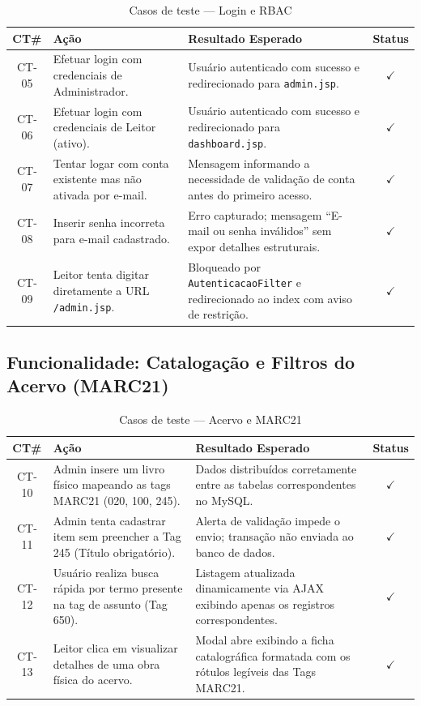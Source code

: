 \begin{table}[h!]
	\centering
	\caption{Casos de teste --- Login e RBAC}
	\label{tab:teste_login}
	\begin{tabular}{|c|p{6cm}|p{6cm}|c|}
		\hline
		\textbf{CT\#} & \textbf{Ação} & \textbf{Resultado Esperado} & \textbf{Status} \\ \hline
		CT-05 & Efetuar login com credenciais de Administrador. & Usuário autenticado com sucesso e redirecionado para \texttt{admin.jsp}. & $\checkmark$ \\ \hline
		CT-06 & Efetuar login com credenciais de Leitor (ativo). & Usuário autenticado com sucesso e redirecionado para \texttt{dashboard.jsp}. & $\checkmark$ \\ \hline
		CT-07 & Tentar logar com conta existente mas não ativada por e-mail. & Mensagem informando a necessidade de validação de conta antes do primeiro acesso. & $\checkmark$ \\ \hline
		CT-08 & Inserir senha incorreta para e-mail cadastrado. & Erro capturado; mensagem ``E-mail ou senha inválidos'' sem expor detalhes estruturais. & $\checkmark$ \\ \hline
		CT-09 & Leitor tenta digitar diretamente a URL \texttt{/admin.jsp}. & Bloqueado por \texttt{AutenticacaoFilter} e redirecionado ao index com aviso de restrição. & $\checkmark$ \\ \hline
	\end{tabular}
\end{table}

\subsection{Funcionalidade: Catalogação e Filtros do Acervo (MARC21)}

\begin{table}[h!]
	\centering
	\caption{Casos de teste --- Acervo e MARC21}
	\label{tab:teste_acervo}
	\begin{tabular}{|c|p{6cm}|p{6cm}|c|}
		\hline
		\textbf{CT\#} & \textbf{Ação} & \textbf{Resultado Esperado} & \textbf{Status} \\ \hline
		CT-10 & Admin insere um livro físico mapeando as tags MARC21 (020, 100, 245). & Dados distribuídos corretamente entre as tabelas correspondentes no MySQL. & $\checkmark$ \\ \hline
		CT-11 & Admin tenta cadastrar item sem preencher a Tag 245 (Título obrigatório). & Alerta de validação impede o envio; transação não enviada ao banco de dados. & $\checkmark$ \\ \hline
		CT-12 & Usuário realiza busca rápida por termo presente na tag de assunto (Tag 650). & Listagem atualizada dinamicamente via AJAX exibindo apenas os registros correspondentes. & $\checkmark$ \\ \hline
		CT-13 & Leitor clica em visualizar detalhes de uma obra física do acervo. & Modal abre exibindo a ficha catalográfica formatada com os rótulos legíveis das Tags MARC21. & $\checkmark$ \\ \hline
	\end{tabular}
\end{table}

